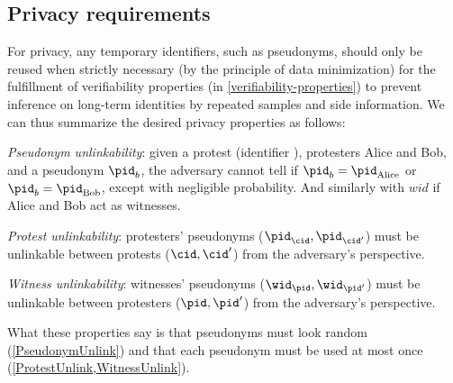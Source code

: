 \subsection{Privacy requirements}%
\label{privacy-properties}

For privacy, any temporary identifiers, such as pseudonyms, should only be 
reused when strictly necessary (by the principle of data minimization) for the 
fulfillment of verifiability properties (in \cref{verifiability-properties}) to 
prevent inference on long-term identities by repeated samples and side 
information.
We can thus summarize the desired privacy properties as follows:
\begin{requirements}[P]
\item\label{PseudonymUnlink} \emph{Pseudonym unlinkability}: given a protest 
  (identifier \cid), protesters Alice and Bob, and a pseudonym \(\pid_b\), the 
  adversary cannot tell if \(\pid_b = \pid_{\text{Alice}}\) or \(\pid_b = 
    \pid_{\text{Bob}}\), except with negligible probability. And similarly with $wid$ if Alice and Bob act as witnesses.
\item\label{ProtestUnlink} \emph{Protest unlinkability}: protesters' pseudonyms 
  (\(\pid_\cid, \pid_{\cid'}\)) must be unlinkable between protests (\(\cid, 
    \cid'\)) from the adversary's perspective.
\item\label{WitnessUnlink}\emph{Witness unlinkability}:  witnesses' pseudonyms 
  (\(\wid_\pid, \wid_{\pid'}\)) must be unlinkable between protesters (\(\pid, 
    \pid'\)) from the adversary's perspective.
\end{requirements}

What these properties say is that pseudonyms must look random 
(\cref{PseudonymUnlink}) and that each pseudonym must be used at most once 
(\cref{ProtestUnlink,WitnessUnlink}).
